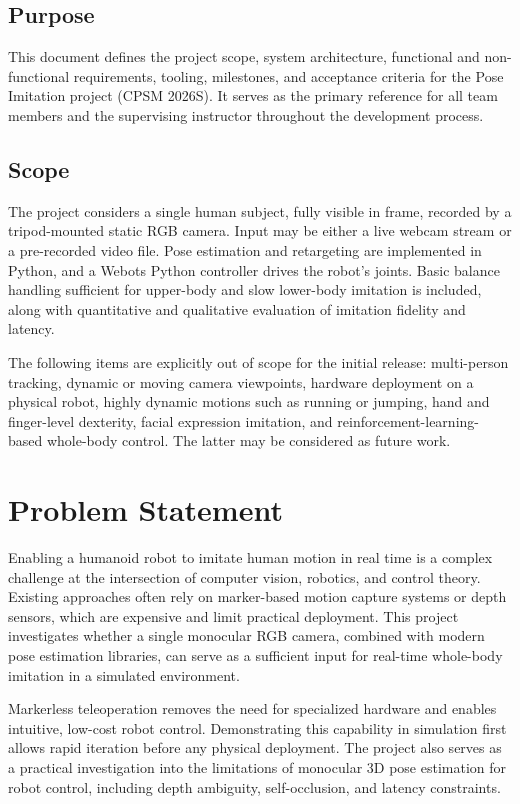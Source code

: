 \documentclass[conference]{IEEEtran}
\begin{document}
\subsection{Purpose}
This document defines the project scope, system architecture, functional and non-functional
requirements, tooling, milestones, and acceptance criteria for the Pose Imitation project
(CPSM 2026S). It serves as the primary reference for all team members and the supervising
instructor throughout the development process.
 
\subsection{Scope}
The project considers a single human subject, fully visible in frame, recorded by a
tripod-mounted static RGB camera. Input may be either a live webcam stream or a pre-recorded
video file. Pose estimation and retargeting are implemented in Python, and a Webots Python
controller drives the robot's joints. Basic balance handling sufficient for upper-body and
slow lower-body imitation is included, along with quantitative and qualitative evaluation of
imitation fidelity and latency.
 
The following items are explicitly out of scope for the initial release: multi-person tracking,
dynamic or moving camera viewpoints, hardware deployment on a physical robot, highly dynamic
motions such as running or jumping, hand and finger-level dexterity, facial expression
imitation, and reinforcement-learning-based whole-body control. The latter may be considered
as future work.
 
\section{Problem Statement}
Enabling a humanoid robot to imitate human motion in real time is a complex challenge at the
intersection of computer vision, robotics, and control theory. Existing approaches often rely
on marker-based motion capture systems or depth sensors, which are expensive and limit
practical deployment. This project investigates whether a single monocular RGB camera,
combined with modern pose estimation libraries, can serve as a sufficient input for real-time
whole-body imitation in a simulated environment.
 
Markerless teleoperation removes the need for specialized hardware and enables intuitive,
low-cost robot control. Demonstrating this capability in simulation first allows rapid
iteration before any physical deployment. The project also serves as a practical investigation
into the limitations of monocular 3D pose estimation for robot control, including depth
ambiguity, self-occlusion, and latency constraints.
 
\end{document}
